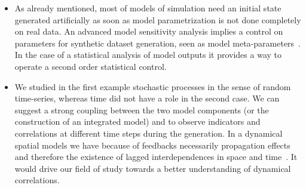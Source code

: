 {\begin{itemize}
\item As already mentioned, most of models of simulation need an initial state generated artificially as soon as model parametrization is not done completely on real data. An advanced model sensitivity analysis implies a control on parameters for synthetic dataset generation, seen as model meta-parameters~\cite{cottineau2015revisiting}. In the case of a statistical analysis of model outputs it provides a way to operate a second order statistical control.
\item We studied in the first example stochastic processes in the sense of random time-series, whereas time did not have a role in the second case. We can suggest a strong coupling between the two model components (or the construction of an integrated model) and to observe indicators and correlations at different time steps during the generation. In a dynamical spatial models we have because of feedbacks necessarily propagation effects and therefore the existence of lagged interdependences in space and time~\cite{pigozzi1980interurban}. It would drive our field of study towards a better understanding of dynamical correlations.
\end{itemize}
}{
}
